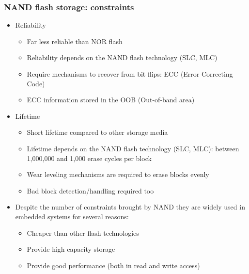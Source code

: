 \begin{frame}
  \frametitle{NAND flash storage: constraints}
  \begin{itemize}
  \item Reliability
    \begin{itemize}
    \item Far less reliable than NOR flash
    \item Reliability depends on the NAND flash technology (SLC, MLC)
    \item Require mechanisms to recover from bit flips: ECC (Error Correcting Code)
    \item ECC information stored in the OOB (Out-of-band area)
    \end{itemize}
  \item Lifetime
    \begin{itemize}
    \item Short lifetime compared to other storage media
    \item Lifetime depends on the NAND flash technology (SLC, MLC):
      between 1,000,000 and 1,000 erase cycles per block
    \item Wear leveling mechanisms are required to erase blocks evenly
    \item Bad block detection/handling required too
    \end{itemize}
  \item Despite the number of constraints brought by NAND they are
  widely used in embedded systems for several reasons:
    \begin{itemize}
    \item Cheaper than other flash technologies
    \item Provide high capacity storage
    \item Provide good performance (both in read and write access)
    \end{itemize}
  \end{itemize}
\end{frame}

